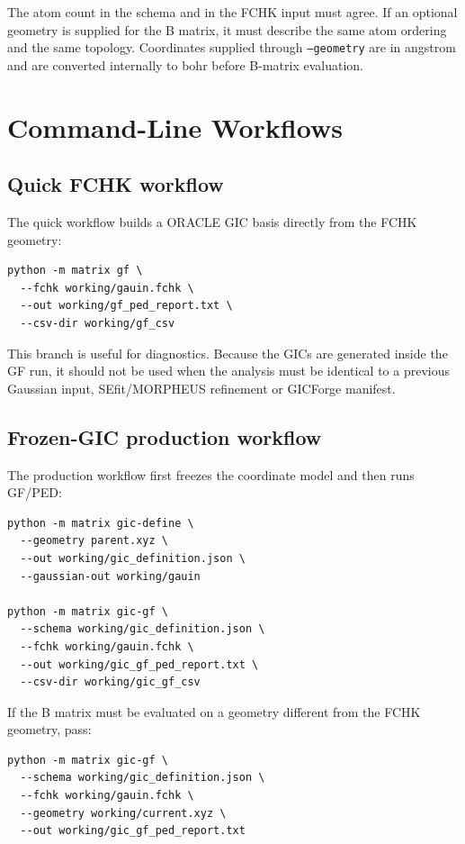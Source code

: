 \documentclass[11pt]{article}
\begin{document}
The atom count in the schema and in the FCHK input must agree.  If an optional
geometry is supplied for the B matrix, it must describe the same atom ordering
and the same topology.  Coordinates supplied through \texttt{--geometry} are in
angstrom and are converted internally to bohr before B-matrix evaluation.

\section{Command-Line Workflows}

\subsection{Quick FCHK workflow}

The quick workflow builds a ORACLE GIC basis directly from the FCHK geometry:

\begin{lstlisting}[style=oracle]
python -m matrix gf \
  --fchk working/gauin.fchk \
  --out working/gf_ped_report.txt \
  --csv-dir working/gf_csv
\end{lstlisting}

\noindent
This branch is useful for diagnostics.  Because the GICs are generated inside
the GF run, it should not be used when the analysis must be identical to a
previous Gaussian input, SEfit/MORPHEUS refinement or GICForge manifest.

\subsection{Frozen-GIC production workflow}

The production workflow first freezes the coordinate model and then runs GF/PED:

\begin{lstlisting}[style=oracle]
python -m matrix gic-define \
  --geometry parent.xyz \
  --out working/gic_definition.json \
  --gaussian-out working/gauin

python -m matrix gic-gf \
  --schema working/gic_definition.json \
  --fchk working/gauin.fchk \
  --out working/gic_gf_ped_report.txt \
  --csv-dir working/gic_gf_csv
\end{lstlisting}

\noindent
If the B matrix must be evaluated on a geometry different from the FCHK
geometry, pass:

\begin{lstlisting}[style=oracle]
python -m matrix gic-gf \
  --schema working/gic_definition.json \
  --fchk working/gauin.fchk \
  --geometry working/current.xyz \
  --out working/gic_gf_ped_report.txt
\end{lstlisting}
\end{document}

